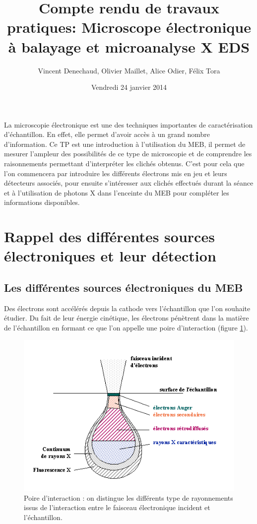 \documentclass[a4paper,12pt]{article}
\title{Compte rendu de travaux pratiques: Microscope électronique à balayage et microanalyse X EDS}
\author{Vincent Denechaud, Olivier Maillet, Alice Odier, Félix Tora}
\date{Vendredi 24 janvier 2014}
\begin{document}
\maketitle

\vfill

\tableofcontents

\newpage

La microscopie électronique est une des techniques importantes de caractérisation d'échantillon. En effet, elle permet d'avoir accès à un grand nombre d'information. Ce TP est une introduction à l'utilisation du MEB, il permet de mesurer l'ampleur des possibilités de ce type de microscopie et de comprendre les raisonnements permettant d'interpréter les clichés obtenus. C'est pour cela que l'on commencera par introduire les différents électrons mis en jeu et leurs détecteurs associés, pour ensuite s'intéresser aux clichés effectués durant la séance et à l'utilisation de photons X dans l'enceinte du MEB pour compléter les informations disponibles.


\section{Rappel des différentes sources électroniques et leur détection}


\subsection{Les différentes sources électroniques du MEB}

Des électrons sont accélérés depuis la cathode vers l'échantillon que l'on souhaite étudier. Du fait de leur énergie cinétique, les électrons pénètrent dans la matière de l'échantillon en formant ce que l'on appelle une poire d'interaction (figure \ref{fig:poire_int}).

\begin{figure}
\centering
\includegraphics[width = 0.8 \textwidth]{images/poire_int.png}
\caption{Poire d'interaction : on distingue les différents type de rayonnements issus de l'interaction entre le faisceau électronique incident et l'échantillon.}
\label{fig:poire_int}
\end{figure}
\end{document}

